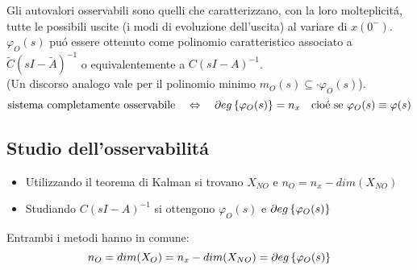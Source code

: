 \documentclass[../main.tex]{subfiles}
\begin{document}
		Gli autovalori osservabili sono quelli che caratterizzano, con la loro molteplicit\'a, tutte le possibili uscite (i modi di evoluzione dell'uscita) al variare di $ x(0^{-}) $. $ \varphi_O(s) $ pu\'o essere ottenuto come polinomio caratteristico associato a $ \tilde C (sI-\tilde A)^{-1} $ o equivalentemente a $ C(sI-A)^{-1} $.\\
		(Un discorso analogo vale per il polinomio minimo $ m_O(s) \subseteq \cdot \varphi_O(s) $).
		\[
			\text{sistema completamente osservabile} \quad\Leftrightarrow\quad \partial eg \left\lbrace \varphi_O(s) \right\rbrace = n_x \quad\text{cio\'e se}\ \varphi_O(s) \equiv \varphi(s)
		\]
		
	\subsection{Studio dell'osservabilit\'a}
		\begin{itemize}
			\item 
				Utilizzando il teorema di Kalman si trovano $ X_{NO} $ e $ n_O = n_x - dim(X_{NO}) $
			\item 
				Studiando $ C(sI-A)^{-1} $ si ottengono $ \varphi_O(s) $ e $ \partial eg \left\lbrace \varphi_O(s) \right\rbrace $
		\end{itemize}
		Entrambi i metodi hanno in comune:
		\[
			n_O = dim(X_O) = n_x - dim(X_{NO}) = \partial eg \left\lbrace \varphi_O(s) \right\rbrace
		\]
		
\end{document}
